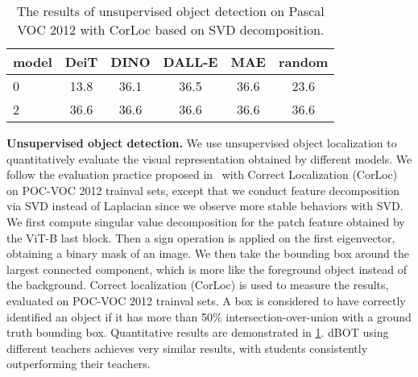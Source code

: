 \documentclass[10pt,twocolumn,letterpaper]{article}
\renewcommand{\paragraph}[1]{\vspace{1.25mm}\noindent\textbf{#1}}
\def\ourmethod{{dBOT}\xspace}
\begin{document}
\begin{table}[t]
	\begin{center}
        \begin{tabular}{l|ccccc}
            model & DeiT & DINO & DALL-E & MAE & random \\
            \hline
            0 & 13.8 & 36.1 & 36.5 & 36.6 & 23.6 \\
            2 & 36.6 & 36.6 & 36.6 & 36.6 &36.6\\
        \end{tabular}
        \end{center}
    \caption{The results of unsupervised object detection on Pascal VOC 2012 with CorLoc based on SVD decomposition.}
    \label{tab:unsup-det}
\vspace{-0.4cm}
\end{table}

\paragraph{Unsupervised object detection.}
We use unsupervised object localization to quantitatively evaluate the visual representation obtained by different models.
We follow the evaluation practice proposed in~\cite{unsup-det} with Correct Localization (CorLoc) on POC-VOC 2012 trainval sets, except that we conduct feature decomposition via SVD instead of Laplacian since we observe more stable behaviors with SVD.
We first compute singular value decomposition for the patch feature obtained by the ViT-B last block. Then a sign operation is applied on the first eigenvector, obtaining a binary mask of an image. We then take the bounding box around the largest connected component, which is more like the foreground object instead of the background. Correct localization (CorLoc) is used to measure the results, evaluated on POC-VOC 2012 trainval sets. A box is considered to have correctly identified an object if it has more than 50\% intersection-over-union with a ground truth bounding box.
Quantitative results are demonstrated in \cref{tab:unsup-det}. \ourmethod using different teachers achieves very similar results, with students consistently outperforming their teachers.
\end{document}
